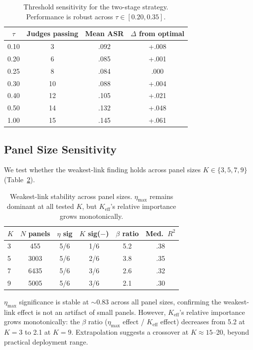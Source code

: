\documentclass[11pt,a4paper]{article}
\begin{document}
\begin{table}[t]
\centering
\small
\caption{Threshold sensitivity for the two-stage strategy. Performance is robust across $\tau \in [0.20, 0.35]$.}
\label{tab:threshold}
\begin{tabular}{@{}cccc@{}}
\toprule
$\tau$ & Judges passing & Mean ASR & $\Delta$ from optimal \\
\midrule
0.10 & 3  & .092 & +.008 \\
0.20 & 6  & .085 & +.001 \\
0.25 & 8  & .084 & .000 \\
0.30 & 10 & .088 & +.004 \\
0.40 & 12 & .105 & +.021 \\
0.50 & 14 & .132 & +.048 \\
1.00 & 15 & .145 & +.061 \\
\bottomrule
\end{tabular}
\vspace{-2mm}
\end{table}

\subsection{Panel Size Sensitivity}

We test whether the weakest-link finding holds across panel sizes $K \in \{3, 5, 7, 9\}$ (Table~\ref{tab:panel-size}).

\begin{table}[t]
\centering
\small
\caption{Weakest-link stability across panel sizes. $\eta_{\max}$ remains dominant at all tested $K$, but $K_{\text{eff}}$'s relative importance grows monotonically.}
\label{tab:panel-size}
\begin{tabular}{@{}lccccc@{}}
\toprule
$K$ & $N$ panels & $\eta$ sig & $K$ sig($-$) & $\beta$ ratio & Med.\ $R^2$ \\
\midrule
3 & 455   & 5/6 & 1/6 & 5.2 & .38 \\
5 & 3003  & 5/6 & 2/6 & 3.8 & .35 \\
7 & 6435  & 5/6 & 3/6 & 2.6 & .32 \\
9 & 5005  & 5/6 & 3/6 & 2.1 & .30 \\
\bottomrule
\end{tabular}
\vspace{-2mm}
\end{table}

$\eta_{\max}$ significance is stable at $\sim$0.83 across all panel sizes, confirming the weakest-link effect is not an artifact of small panels. However, $K_{\text{eff}}$'s relative importance grows monotonically: the $\beta$ ratio ($\eta_{\max}$ effect / $K_{\text{eff}}$ effect) decreases from 5.2 at $K=3$ to 2.1 at $K=9$. Extrapolation suggests a crossover at $K \approx 15$--20, beyond practical deployment range.
\end{document}
